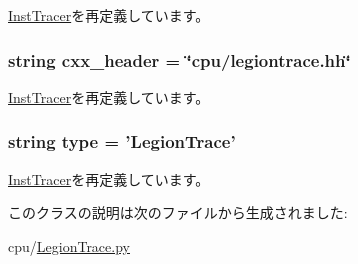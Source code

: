 \hyperlink{classInstTracer_1_1InstTracer_a58cd55cd4023648e138237cfc0822ae3}{InstTracer}を再定義しています。\hypertarget{classLegionTrace_1_1LegionTrace_a17da7064bc5c518791f0c891eff05fda}{
\subsubsection[{cxx\_\-header}]{\setlength{\rightskip}{0pt plus 5cm}string {\bf cxx\_\-header} = \char`\"{}cpu/legiontrace.hh\char`\"{}}}
\label{classLegionTrace_1_1LegionTrace_a17da7064bc5c518791f0c891eff05fda}


\hyperlink{classInstTracer_1_1InstTracer_a17da7064bc5c518791f0c891eff05fda}{InstTracer}を再定義しています。\hypertarget{classLegionTrace_1_1LegionTrace_acce15679d830831b0bbe8ebc2a60b2ca}{
\subsubsection[{type}]{\setlength{\rightskip}{0pt plus 5cm}string {\bf type} = '{\bf LegionTrace}'}}
\label{classLegionTrace_1_1LegionTrace_acce15679d830831b0bbe8ebc2a60b2ca}


\hyperlink{classInstTracer_1_1InstTracer_acce15679d830831b0bbe8ebc2a60b2ca}{InstTracer}を再定義しています。

このクラスの説明は次のファイルから生成されました:\begin{DoxyCompactItemize}
\item 
cpu/\hyperlink{LegionTrace_8py}{LegionTrace.py}\end{DoxyCompactItemize}

